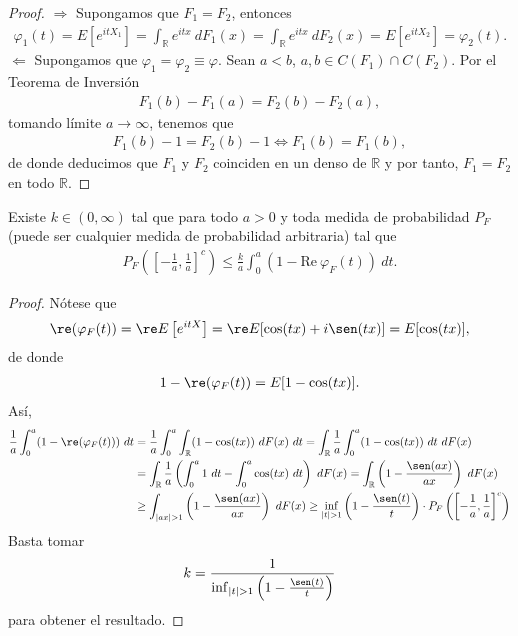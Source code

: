 \begin{proof}
    $\boxed{\Longrightarrow}$ Supongamos que $F_1 = F_2$, entonces
    \begin{align*}
        \varphi_1(t) = E\left[ e^{itX_1} \right] = \int_{\mathbb{R}} e^{itx} \ dF_1(x) = \int_{\mathbb{R}} e^{itx} \ dF_2(x) = E\left[ e^{itX_2} \right] = \varphi_2(t).
    \end{align*}
    $\boxed{\Longleftarrow}$ Supongamos que $\varphi_1 = \varphi_2 \equiv \varphi$. Sean $a < b$, $a,b \in C(F_1) \cap C(F_2)$. Por el Teorema de Inversión
    \begin{align*}
        F_1(b) - F_1(a) = F_2(b) - F_2(a),
    \end{align*}
    tomando límite $a \to \infty$, tenemos que
    \begin{align*}
        F_1(b) - 1 = F_2(b) - 1 \Longleftrightarrow F_1(b) = F_1(b),
    \end{align*}
    de donde deducimos que $F_1$ y $F_2$ coinciden en un denso de $\mathbb{R}$ y por tanto, $F_1 = F_2$ en todo $\mathbb{R}$.
\end{proof}

\begin{teo}
    Existe $k \in (0,\infty)$ tal que para todo $a > 0$ y toda medida de probabilidad $P_F$ (puede ser cualquier medida de probabilidad arbitraria) tal que
    \begin{align*}
        P_F\left( \left[ - \frac{1}{a}, \frac{1}{a} \right]^c \right) \leq \frac{k}{a} \int_{0}^{a} (1 - \text{Re} \ \varphi_F(t)) \ dt.
    \end{align*}
\end{teo}

\begin{proof}
    Nótese que
    \begin{align*}
        \re ( \varphi_F(t)) = \re E\left[e^{itX} \right] = \re E[\cos(tx) + i\sen(tx)] = E[\cos(tx)],  
    \end{align*}
    de donde
    \begin{align*}
        1 - \re (\varphi_F(t)) = E[1- \cos(tx)].
    \end{align*}
    Así,
    \begin{align*}
        \frac{1}{a} \int_{0}^{a} (1 - \re (\varphi_F(t))) \ dt &= \frac{1}{a} \int_{0}^{a} \int_{\mathbb{R}} (1 - \cos(tx)) \ dF(x) \ dt = \int_{\mathbb{R}} \frac{1}{a} \int_{0}^{a} (1 - \cos(tx)) \ dt \ dF(x) \\
        &= \int_{\mathbb{R}} \frac{1}{a} \left( \int_{0}^{a} 1 \ dt - \int_{0}^{a} \cos(tx) \ dt\right) \ dF(x) = \int_{\mathbb{R}} \left( 1 - \frac{\sen(ax)}{ax} \right) \ dF(x) \\
        & \ge \int_{|ax|>1} \left( 1 - \frac{\sen(ax)}{ax} \right) \ dF(x) \ge \inf_{|t| > 1} \left( 1 - \frac{\sen(t)}{t} \right) \cdot  P_F\left( \left[ - \frac{1}{a}, \frac{1}{a} \right]^c \right)
    \end{align*}
    Basta tomar
    \begin{align*}
        k = \frac{1}{\inf_{|t| > 1} \left( 1 - \frac{\sen(t)}{t} \right)}
    \end{align*}
    para obtener el resultado.
\end{proof}

